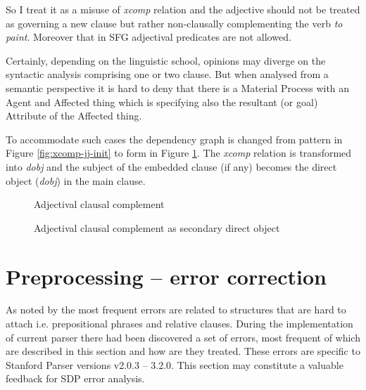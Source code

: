So I treat it as a misuse of \textit{xcomp} relation and the adjective should not be treated as governing a new clause but rather non-clausally complementing the verb \textit{to paint}. Moreover that in SFG adjectival predicates are not allowed.

Certainly, depending on the linguistic school, opinions may diverge on the syntactic analysis comprising one or two clause. But when analysed from a semantic perspective it is hard to deny that there is a Material Process with an Agent and Affected thing which is specifying also the resultant (or goal) Attribute of the Affected thing. 

To accommodate such cases the dependency graph is changed from pattern in Figure \ref{fig:xcomp-jj-init} to form in Figure \ref{fig:xcomp-jj-final}. The \textit{xcomp} relation is transformed into \textit{dobj} and the subject of the embedded clause (if any) becomes the direct object (\textit{dobj}) in the main clause.

\begin{figure}[H]
	\begin{minipage}{0.45\linewidth}
		\centering
		\caption{Adjectival clausal complement}
		\label{fig:xcomp-jj-init}
	\end{minipage}
	\quad
	\begin{minipage}{0.45\linewidth}
		\centering
		\caption{Adjectival clausal complement as secondary direct object}
		\label{fig:xcomp-jj-final}
	\end{minipage}
\end{figure}

\section{Preprocessing -- error correction}
As noted by \citet{Cer2010a} the most frequent errors are related to structures that are hard to attach i.e. prepositional phrases and relative clauses. During the implementation of current parser there had been discovered a set of errors, most frequent of which are described in this section and how are they treated. These errors are specific to Stanford Parser versions v2.0.3 -- 3.2.0. This section may constitute a valuable feedback for SDP error analysis. 

